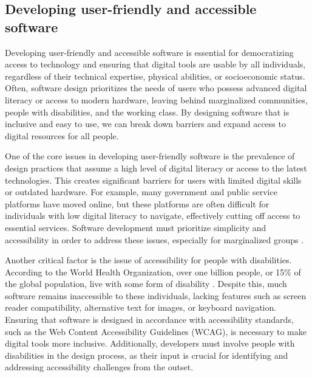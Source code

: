 \begin{refsection}
\subsection{Developing user-friendly and accessible software}

Developing user-friendly and accessible software is essential for democratizing access to technology and ensuring that digital tools are usable by all individuals, regardless of their technical expertise, physical abilities, or socioeconomic status. Often, software design prioritizes the needs of users who possess advanced digital literacy or access to modern hardware, leaving behind marginalized communities, people with disabilities, and the working class. By designing software that is inclusive and easy to use, we can break down barriers and expand access to digital resources for all people.

One of the core issues in developing user-friendly software is the prevalence of design practices that assume a high level of digital literacy or access to the latest technologies. This creates significant barriers for users with limited digital skills or outdated hardware. For example, many government and public service platforms have moved online, but these platforms are often difficult for individuals with low digital literacy to navigate, effectively cutting off access to essential services. Software development must prioritize simplicity and accessibility in order to address these issues, especially for marginalized groups \cite[pp.~112-115]{norman1988design}.

Another critical factor is the issue of accessibility for people with disabilities. According to the World Health Organization, over one billion people, or 15\% of the global population, live with some form of disability \cite{who2021disability}. Despite this, much software remains inaccessible to these individuals, lacking features such as screen reader compatibility, alternative text for images, or keyboard navigation. Ensuring that software is designed in accordance with accessibility standards, such as the Web Content Accessibility Guidelines (WCAG), is necessary to make digital tools more inclusive. Additionally, developers must involve people with disabilities in the design process, as their input is crucial for identifying and addressing accessibility challenges from the outset.


\end{refsection}
